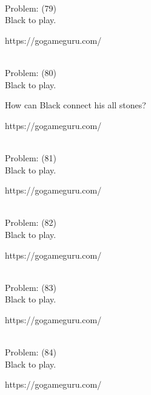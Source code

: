 \documentclass[11pt]{article}
\begin{document}
\begin{minipage}[t]{0.5\textwidth}
  {\centering
  
\\
  Problem: (79)\\
  Black to play.

https://gogameguru.com/\\
  }
\end{minipage}
\begin{minipage}[t]{0.5\textwidth}
  {\centering
  
\\
  Problem: (80)\\
  Black to play.

How can Black connect his all stones?

https://gogameguru.com/\\
  }
\end{minipage}
\begin{minipage}[t]{0.5\textwidth}
  {\centering
  
\\
  Problem: (81)\\
  Black to play.

https://gogameguru.com/\\
  }
\end{minipage}
\begin{minipage}[t]{0.5\textwidth}
  {\centering
  
\\
  Problem: (82)\\
  Black to play.

https://gogameguru.com/\\
  }
\end{minipage}
\begin{minipage}[t]{0.5\textwidth}
  {\centering
  
\\
  Problem: (83)\\
  Black to play.

https://gogameguru.com/\\
  }
\end{minipage}
\begin{minipage}[t]{0.5\textwidth}
  {\centering
  
\\
  Problem: (84)\\
  Black to play.

https://gogameguru.com/\\
  }
\end{minipage}
\end{document}
